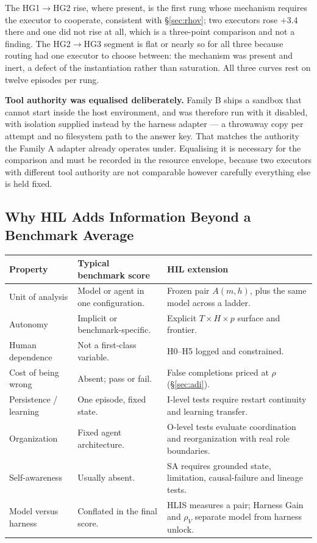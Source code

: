 \documentclass[11pt]{article}
\theoremstyle{definition}
\newcommand{\rhov}{\ensuremath{\rho_V}}
\begin{document}
The HG1$\to$HG2 rise, where present, is the first rung whose mechanism requires the executor to cooperate, consistent with \S\ref{sec:rhov}; two executors rose $+3.4$ there and one did not rise at all, which is a three-point comparison and not a finding. The HG2$\to$HG3 segment is flat or nearly so for all three because routing had one executor to choose between: the mechanism was present and inert, a defect of the instantiation rather than saturation. All three curves rest on twelve episodes per rung.

\textbf{Tool authority was equalised deliberately.} Family B ships a sandbox that cannot start inside the host environment, and was therefore run with it disabled, with isolation supplied instead by the harness adapter --- a throwaway copy per attempt and no filesystem path to the answer key. That matches the authority the Family A adapter already operates under. Equalising it is necessary for the comparison and must be recorded in the resource envelope, because two executors with different tool authority are not comparable however carefully everything else is held fixed.

\subsection{Why HIL Adds Information Beyond a Benchmark Average}

\begin{table}[h]
\centering\small
\begin{tabularx}{\textwidth}{@{}lYY@{}}
\toprule
Property & Typical benchmark score & HIL extension \\
\midrule
Unit of analysis & Model or agent in one configuration. & Frozen pair $A(m,h)$, plus the same model across a ladder. \\
Autonomy & Implicit or benchmark-specific. & Explicit $T \times H \times p$ surface and frontier. \\
Human dependence & Not a first-class variable. & H0--H5 logged and constrained. \\
Cost of being wrong & Absent; pass or fail. & False completions priced at $\rho$ (\S\ref{sec:adi}). \\
Persistence / learning & One episode, fixed state. & I-level tests require restart continuity and learning transfer. \\
Organization & Fixed agent architecture. & O-level tests evaluate coordination and reorganization with real role boundaries. \\
Self-awareness & Usually absent. & SA requires grounded state, limitation, causal-failure and lineage tests. \\
Model versus harness & Conflated in the final score. & HLIS measures a pair; Harness Gain and \rhov{} separate model from harness unlock. \\
\bottomrule
\end{tabularx}
\end{table}
\end{document}
